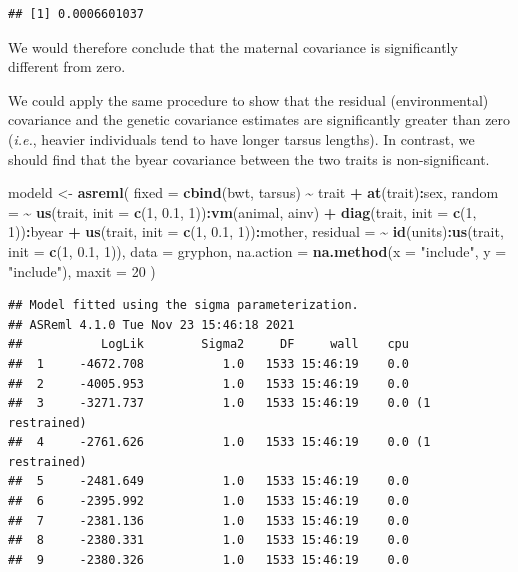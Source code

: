 \documentclass[
  12pt,
]{book}
\newenvironment{Shaded}{\begin{snugshade}}{\end{snugshade}}
\newcommand{\DataTypeTok}[1]{\textcolor[rgb]{0.13,0.29,0.53}{#1}}
\newcommand{\DecValTok}[1]{\textcolor[rgb]{0.00,0.00,0.81}{#1}}
\newcommand{\FloatTok}[1]{\textcolor[rgb]{0.00,0.00,0.81}{#1}}
\newcommand{\KeywordTok}[1]{\textcolor[rgb]{0.13,0.29,0.53}{\textbf{#1}}}
\newcommand{\NormalTok}[1]{#1}
\newcommand{\OperatorTok}[1]{\textcolor[rgb]{0.81,0.36,0.00}{\textbf{#1}}}
\newcommand{\StringTok}[1]{\textcolor[rgb]{0.31,0.60,0.02}{#1}}
\begin{document}
\begin{verbatim}
## [1] 0.0006601037
\end{verbatim}

We would therefore conclude that the maternal covariance is significantly different from zero.

We could apply the same procedure to show that the residual (environmental) covariance and the genetic covariance estimates are significantly greater than zero (\emph{i.e.}, heavier individuals tend to have longer tarsus lengths). In contrast, we should find that the byear covariance between the two traits is non-significant.

\begin{Shaded}
\begin{Highlighting}[]
\NormalTok{modeld \textless{}{-}}\StringTok{ }\KeywordTok{asreml}\NormalTok{(}
  \DataTypeTok{fixed =} \KeywordTok{cbind}\NormalTok{(bwt, tarsus) }\OperatorTok{\textasciitilde{}}\StringTok{ }\NormalTok{trait }\OperatorTok{+}\StringTok{ }\KeywordTok{at}\NormalTok{(trait)}\OperatorTok{:}\NormalTok{sex,}
  \DataTypeTok{random =} \OperatorTok{\textasciitilde{}}\StringTok{ }\KeywordTok{us}\NormalTok{(trait, }\DataTypeTok{init =} \KeywordTok{c}\NormalTok{(}\DecValTok{1}\NormalTok{, }\FloatTok{0.1}\NormalTok{, }\DecValTok{1}\NormalTok{))}\OperatorTok{:}\KeywordTok{vm}\NormalTok{(animal, ainv) }\OperatorTok{+}
\StringTok{    }\KeywordTok{diag}\NormalTok{(trait, }\DataTypeTok{init =} \KeywordTok{c}\NormalTok{(}\DecValTok{1}\NormalTok{, }\DecValTok{1}\NormalTok{))}\OperatorTok{:}\NormalTok{byear }\OperatorTok{+}
\StringTok{    }\KeywordTok{us}\NormalTok{(trait, }\DataTypeTok{init =} \KeywordTok{c}\NormalTok{(}\DecValTok{1}\NormalTok{, }\FloatTok{0.1}\NormalTok{, }\DecValTok{1}\NormalTok{))}\OperatorTok{:}\NormalTok{mother,}
  \DataTypeTok{residual =} \OperatorTok{\textasciitilde{}}\StringTok{ }\KeywordTok{id}\NormalTok{(units)}\OperatorTok{:}\KeywordTok{us}\NormalTok{(trait, }\DataTypeTok{init =} \KeywordTok{c}\NormalTok{(}\DecValTok{1}\NormalTok{, }\FloatTok{0.1}\NormalTok{, }\DecValTok{1}\NormalTok{)),}
  \DataTypeTok{data =}\NormalTok{ gryphon,}
  \DataTypeTok{na.action =} \KeywordTok{na.method}\NormalTok{(}\DataTypeTok{x =} \StringTok{"include"}\NormalTok{, }\DataTypeTok{y =} \StringTok{"include"}\NormalTok{),}
  \DataTypeTok{maxit =} \DecValTok{20}
\NormalTok{)}
\end{Highlighting}
\end{Shaded}

\begin{verbatim}
## Model fitted using the sigma parameterization.
## ASReml 4.1.0 Tue Nov 23 15:46:18 2021
##           LogLik        Sigma2     DF     wall    cpu
##  1     -4672.708           1.0   1533 15:46:19    0.0
##  2     -4005.953           1.0   1533 15:46:19    0.0
##  3     -3271.737           1.0   1533 15:46:19    0.0 (1 restrained)
##  4     -2761.626           1.0   1533 15:46:19    0.0 (1 restrained)
##  5     -2481.649           1.0   1533 15:46:19    0.0
##  6     -2395.992           1.0   1533 15:46:19    0.0
##  7     -2381.136           1.0   1533 15:46:19    0.0
##  8     -2380.331           1.0   1533 15:46:19    0.0
##  9     -2380.326           1.0   1533 15:46:19    0.0
\end{verbatim}
\end{document}
